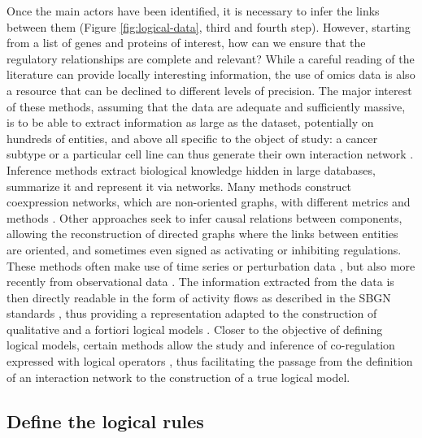 \documentclass[a4paper,12pt,twoside,onecolumn,openright,final,oldfontcommands]{memoir}
\begin{document}
Once the main actors have been identified, it is necessary to infer the
links between them (Figure \ref{fig:logical-data}, third and fourth
step). However, starting from a list of genes and proteins of interest,
how can we ensure that the regulatory relationships are complete and
relevant? While a careful reading of the literature can provide locally
interesting information, the use of omics data is also a resource that
can be declined to different levels of precision. The major interest of
these methods, assuming that the data are adequate and sufficiently
massive, is to be able to extract information as large as the dataset,
potentially on hundreds of entities, and above all specific to the
object of study: a cancer subtype or a particular cell line can thus
generate their own interaction network \citep{lefebvre2010human}.
Inference methods extract biological knowledge hidden in large
databases, summarize it and represent it via networks. Many methods
construct coexpression networks, which are non-oriented graphs, with
different metrics and methods \citep{margolin2006aracne, vert2007new}.
Other approaches seek to infer causal relations between components,
allowing the reconstruction of directed graphs where the links between
entities are oriented, and sometimes even signed as activating or
inhibiting regulations. These methods often make use of time series
\citep{hill2016inferring} or perturbation data
\citep{meinshausen2016methods}, but also more recently from
observational data \citep{verny2017learning}. The information extracted
from the data is then directly readable in the form of activity flows as
described in the SBGN standards \citep{novere2009systems}, thus
providing a representation adapted to the construction of qualitative
and a fortiori logical models \citep{le2015quantitative}. Closer to the
objective of defining logical models, certain methods allow the study
and inference of co-regulation expressed with logical operators
\citep{elatili2007corn}, thus facilitating the passage from the
definition of an interaction network to the construction of a true
logical model.

\subsection{Define the logical rules}\label{define-the-logical-rules}
\end{document}

